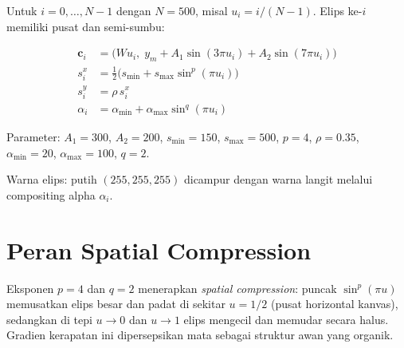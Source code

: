 \documentclass[11pt]{article}
\begin{document}
Untuk $i = 0, \ldots, N - 1$ dengan $N = 500$, misal $u_i = i/(N-1)$.
Elips ke-$i$ memiliki pusat dan semi-sumbu:

\begin{align}
\mathbf{c}_i &= \bigl( W u_i,\; y_m + A_1 \sin(3\pi u_i) + A_2 \sin(7\pi u_i) \bigr) \\
s_i^x &= \tfrac{1}{2}\bigl( s_{\min} + s_{\max} \sin^{p}(\pi u_i) \bigr) \\
s_i^y &= \rho\, s_i^{x} \\
\alpha_i &= \alpha_{\min} + \alpha_{\max} \sin^{q}(\pi u_i)
\end{align}

Parameter: $A_1 = 300$, $A_2 = 200$, $s_{\min}=150$, $s_{\max}=500$,
$p=4$, $\rho=0.35$, $\alpha_{\min}=20$, $\alpha_{\max}=100$, $q=2$.

Warna elips: putih $(255, 255, 255)$ dicampur dengan warna langit
melalui compositing alpha $\alpha_i$.

\section{Peran Spatial Compression}

Eksponen $p = 4$ dan $q = 2$ menerapkan \emph{spatial compression}:
puncak $\sin^{p}(\pi u)$ memusatkan elips besar dan padat di sekitar
$u = 1/2$ (pusat horizontal kanvas), sedangkan di tepi $u \to 0$ dan
$u \to 1$ elips mengecil dan memudar secara halus. Gradien kerapatan
ini dipersepsikan mata sebagai struktur awan yang organik.
\end{document}
